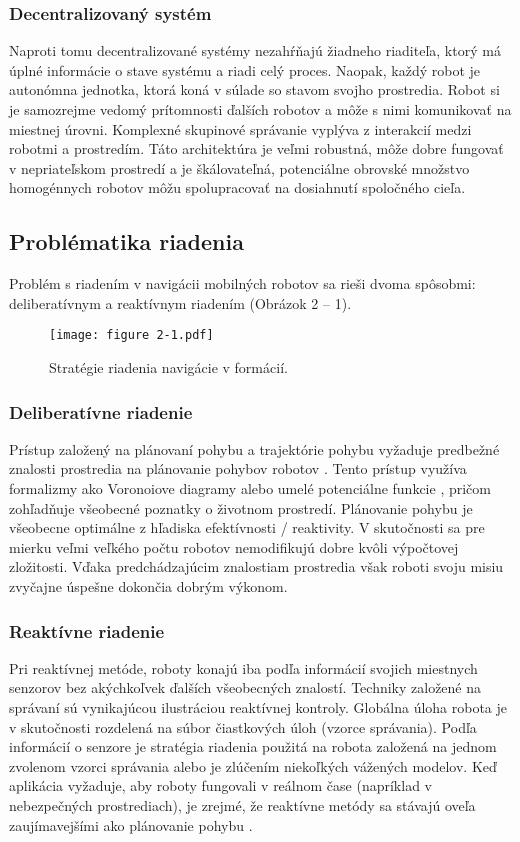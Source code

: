 \subsubsection{Decentralizovaný systém}
Naproti tomu decentralizované systémy nezahŕňajú žiadneho riaditeľa, ktorý má úplné informácie o stave systému a riadi
celý proces. Naopak, každý robot je autonómna jednotka, ktorá koná v súlade so stavom svojho prostredia. Robot si je
samozrejme vedomý prítomnosti ďalších robotov a môže s nimi komunikovať na miestnej úrovni. Komplexné skupinové
správanie vyplýva z interakcií medzi robotmi a prostredím. Táto architektúra je veľmi robustná, môže dobre fungovať v
nepriateľskom prostredí a je škálovateľná, potenciálne obrovské množstvo homogénnych robotov môžu spolupracovať na
dosiahnutí spoločného cieľa.

\subsection{Problématika riadenia}
Problém s riadením v navigácii mobilných robotov sa rieši dvoma spôsobmi: deliberatívnym a reaktívnym riadením (Obrázok 2 –
1).

\begin{figure}[ht!]
    \centering
    \texttt{[image: figure 2-1.pdf]}
    \caption{Stratégie riadenia navigácie v formácií.}
    \label{o:3}
\end{figure}

\subsubsection{Deliberatívne riadenie}
Prístup založený na plánovaní pohybu a trajektórie pohybu vyžaduje predbežné znalosti prostredia na plánovanie pohybov
robotov \citep{vascak}. Tento prístup využíva formalizmy ako Voronoiove diagramy alebo umelé potenciálne funkcie \citep{rimon},
pričom zohľadňuje všeobecné poznatky o životnom prostredí. Plánovanie pohybu je všeobecne optimálne z hľadiska
efektívnosti / reaktivity. V skutočnosti sa pre mierku veľmi veľkého počtu robotov nemodifikujú dobre kvôli výpočtovej
zložitosti. Vďaka predchádzajúcim znalostiam prostredia však roboti svoju misiu zvyčajne úspešne dokončia dobrým
výkonom.

\subsubsection{Reaktívne riadenie}
Pri reaktívnej metóde, roboty konajú iba podľa informácií svojich miestnych senzorov bez akýchkoľvek
ďalších všeobecných znalostí. Techniky založené na správaní sú vynikajúcou ilustráciou reaktívnej kontroly.
Globálna úloha robota je v skutočnosti rozdelená na súbor čiastkových úloh (vzorce správania).
Podľa informácií o senzore je stratégia riadenia použitá na robota založená na jednom zvolenom vzorci správania 
alebo je zlúčením niekoľkých vážených modelov. Keď aplikácia vyžaduje, aby roboty fungovali v reálnom čase (napríklad v nebezpečných
prostrediach), je zrejmé, že reaktívne metódy sa stávajú oveľa zaujímavejšími ako plánovanie pohybu \citep{vascak}.

